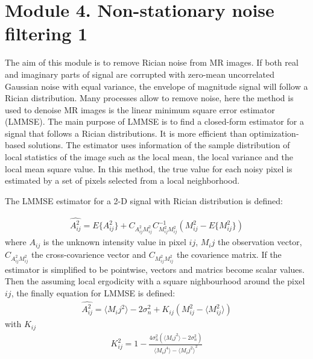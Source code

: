 \section{Module 4. Non-stationary noise filtering 1}

The aim of this module is to remove Rician noise from MR images. If
both real and imaginary parts of signal are corrupted with zero-mean
uncorrelated Gaussian noise with equal variance, the envelope of magnitude
signal will follow a Rician distribution. Many processes allow to
remove noise, here the method is used to denoise MR images is the
linear minimum square error estimator (LMMSE). The main purpose of
LMMSE is to find a closed-form estimator for a signal that follows
a Rician distributions. It is more efficient than optimization-based
solutions. The estimator uses information of the sample distribution
of local statistics of the image such as the local mean, the local
variance and the local mean square value. In this method, the true
value for each noisy pixel is estimated by a set of pixels selected
from a local neighborhood.

The LMMSE estimator for a 2-D signal with Rician distribution is defined:

\begin{equation}
\begin{aligned}\widehat{A_{ij}^{2}}=E\{A_{ij}^{2}\}+C_{A_{ij}^{2}M_{ij}^{2}}C_{M_{ij}^{2}M_{ij}^{2}}^{-1}(M_{ij}^{2}-E\{M_{ij}^{2}\})\end{aligned}
\label{m4eq1}
\end{equation}
where $A_{ij}$ is the unknown intensity value in pixel $ij$, $M_{i}j$
the observation vector, $C_{A_{ij}^{2}M_{ij}^{2}}$ the cross-covarience
vector and $C_{M_{ij}^{2}M_{ij}^{2}}$ the covarience matrix. If the
estimator is simplified to be pointwise, vectors and matrics become
scalar values. Then the assuming local ergodicity with a square nighbourhood
around the pixel $ij$, the finally equation for LMMSE is defined:
\begin{equation}
\begin{aligned}\widehat{A_{ij}^{2}}=\langle M_{i}j^{2}\rangle-2\sigma_{n}^{2}+K_{ij}(M_{ij}^{2}-\langle M_{ij}^{2}\rangle)\end{aligned}
\label{m4eq2}
\end{equation}
with $K_{ij}$ 
\begin{equation}
\begin{aligned}K_{ij}^{2}=1-\frac{4\sigma_{n}^{2}(\langle M_{i}j^{2}\rangle-2\sigma_{n}^{2})}{\langle M_{i}j^{4}\rangle-{\langle M_{i}j^{2}\rangle}^{2}}\end{aligned}
\label{m4eq3}
\end{equation}

